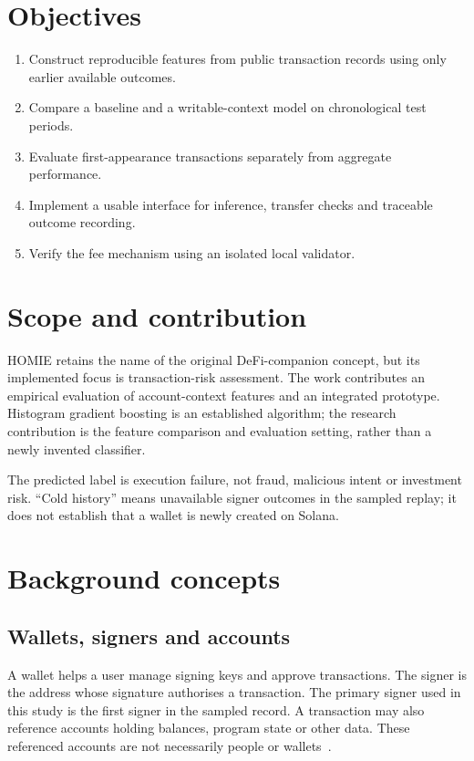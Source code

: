 \documentclass[12pt,a4paper,oneside]{report}
\begin{document}
\section{Objectives}
\begin{enumerate}
\item Construct reproducible features from public transaction records using only earlier available outcomes.
\item Compare a baseline and a writable-context model on chronological test periods.
\item Evaluate first-appearance transactions separately from aggregate performance.
\item Implement a usable interface for inference, transfer checks and traceable outcome recording.
\item Verify the fee mechanism using an isolated local validator.
\end{enumerate}
\section{Scope and contribution}
HOMIE retains the name of the original DeFi-companion concept, but its implemented focus is transaction-risk assessment. The work contributes an empirical evaluation of account-context features and an integrated prototype. Histogram gradient boosting is an established algorithm; the research contribution is the feature comparison and evaluation setting, rather than a newly invented classifier.

The predicted label is execution failure, not fraud, malicious intent or investment risk. ``Cold history'' means unavailable signer outcomes in the sampled replay; it does not establish that a wallet is newly created on Solana.

\section{Background concepts}
\subsection{Wallets, signers and accounts}
A wallet helps a user manage signing keys and approve transactions. The signer is the address whose signature authorises a transaction. The primary signer used in this study is the first signer in the sampled record. A transaction may also reference accounts holding balances, program state or other data. These referenced accounts are not necessarily people or wallets~\cite{accounts,transactions}.
\end{document}
